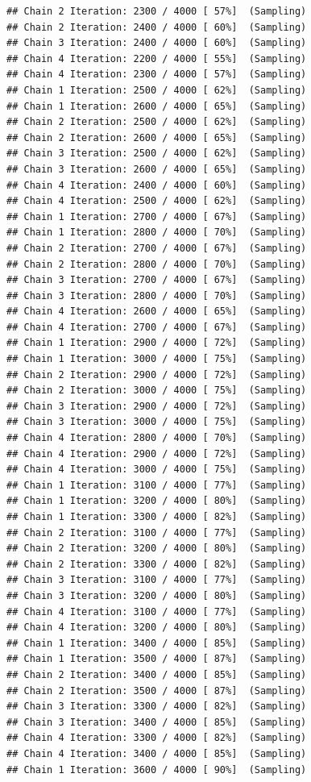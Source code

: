 \documentclass[
]{article}
\begin{document}
\begin{verbatim}
## Chain 2 Iteration: 2300 / 4000 [ 57%]  (Sampling) 
## Chain 2 Iteration: 2400 / 4000 [ 60%]  (Sampling) 
## Chain 3 Iteration: 2400 / 4000 [ 60%]  (Sampling) 
## Chain 4 Iteration: 2200 / 4000 [ 55%]  (Sampling) 
## Chain 4 Iteration: 2300 / 4000 [ 57%]  (Sampling) 
## Chain 1 Iteration: 2500 / 4000 [ 62%]  (Sampling) 
## Chain 1 Iteration: 2600 / 4000 [ 65%]  (Sampling) 
## Chain 2 Iteration: 2500 / 4000 [ 62%]  (Sampling) 
## Chain 2 Iteration: 2600 / 4000 [ 65%]  (Sampling) 
## Chain 3 Iteration: 2500 / 4000 [ 62%]  (Sampling) 
## Chain 3 Iteration: 2600 / 4000 [ 65%]  (Sampling) 
## Chain 4 Iteration: 2400 / 4000 [ 60%]  (Sampling) 
## Chain 4 Iteration: 2500 / 4000 [ 62%]  (Sampling) 
## Chain 1 Iteration: 2700 / 4000 [ 67%]  (Sampling) 
## Chain 1 Iteration: 2800 / 4000 [ 70%]  (Sampling) 
## Chain 2 Iteration: 2700 / 4000 [ 67%]  (Sampling) 
## Chain 2 Iteration: 2800 / 4000 [ 70%]  (Sampling) 
## Chain 3 Iteration: 2700 / 4000 [ 67%]  (Sampling) 
## Chain 3 Iteration: 2800 / 4000 [ 70%]  (Sampling) 
## Chain 4 Iteration: 2600 / 4000 [ 65%]  (Sampling) 
## Chain 4 Iteration: 2700 / 4000 [ 67%]  (Sampling) 
## Chain 1 Iteration: 2900 / 4000 [ 72%]  (Sampling) 
## Chain 1 Iteration: 3000 / 4000 [ 75%]  (Sampling) 
## Chain 2 Iteration: 2900 / 4000 [ 72%]  (Sampling) 
## Chain 2 Iteration: 3000 / 4000 [ 75%]  (Sampling) 
## Chain 3 Iteration: 2900 / 4000 [ 72%]  (Sampling) 
## Chain 3 Iteration: 3000 / 4000 [ 75%]  (Sampling) 
## Chain 4 Iteration: 2800 / 4000 [ 70%]  (Sampling) 
## Chain 4 Iteration: 2900 / 4000 [ 72%]  (Sampling) 
## Chain 4 Iteration: 3000 / 4000 [ 75%]  (Sampling) 
## Chain 1 Iteration: 3100 / 4000 [ 77%]  (Sampling) 
## Chain 1 Iteration: 3200 / 4000 [ 80%]  (Sampling) 
## Chain 1 Iteration: 3300 / 4000 [ 82%]  (Sampling) 
## Chain 2 Iteration: 3100 / 4000 [ 77%]  (Sampling) 
## Chain 2 Iteration: 3200 / 4000 [ 80%]  (Sampling) 
## Chain 2 Iteration: 3300 / 4000 [ 82%]  (Sampling) 
## Chain 3 Iteration: 3100 / 4000 [ 77%]  (Sampling) 
## Chain 3 Iteration: 3200 / 4000 [ 80%]  (Sampling) 
## Chain 4 Iteration: 3100 / 4000 [ 77%]  (Sampling) 
## Chain 4 Iteration: 3200 / 4000 [ 80%]  (Sampling) 
## Chain 1 Iteration: 3400 / 4000 [ 85%]  (Sampling) 
## Chain 1 Iteration: 3500 / 4000 [ 87%]  (Sampling) 
## Chain 2 Iteration: 3400 / 4000 [ 85%]  (Sampling) 
## Chain 2 Iteration: 3500 / 4000 [ 87%]  (Sampling) 
## Chain 3 Iteration: 3300 / 4000 [ 82%]  (Sampling) 
## Chain 3 Iteration: 3400 / 4000 [ 85%]  (Sampling) 
## Chain 4 Iteration: 3300 / 4000 [ 82%]  (Sampling) 
## Chain 4 Iteration: 3400 / 4000 [ 85%]  (Sampling) 
## Chain 1 Iteration: 3600 / 4000 [ 90%]  (Sampling) 

\end{verbatim}
\end{document}
